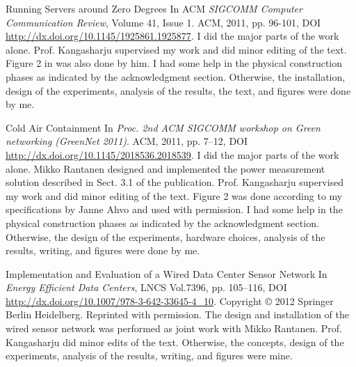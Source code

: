 \clearpage

\label{theme:free}

{Running Servers around Zero Degrees}
{In ACM \textit{SIGCOMM Computer Communication Review}, Volume 41, Issue 1. ACM, 2011, pp.
96-101, DOI \url{http://dx.doi.org/10.1145/1925861.1925877}.}
{}
{I did the major parts of the work alone. Prof. Kangasharju supervised my
work and did minor editing of the text. Figure 2 in was also done by him. I
had some help in the physical construction phases as indicated by the
acknowledgment section. Otherwise, the installation, design of the
experiments, analysis of the results, the text, and figures were done by
me.}
\label{pub:zero}


\label{theme:air}

{Cold Air Containment}
{In \textit{Proc. 2nd ACM SIGCOMM workshop on Green networking (GreenNet
2011)}. ACM, 2011, pp. 7--12, DOI \url{http://dx.doi.org/10.1145/2018536.2018539}.}
{}
{I did the major parts of the work alone. Mikko Rantanen designed and
implemented the power measurement solution described in Sect. 3.1 of the
publication. Prof. Kangasharju supervised my work and did minor editing of the
text. Figure 2 was done according to my specifications by Janne Ahvo and used
with permission. I had some help in the physical construction phases as
indicated by the acknowledgment section.  Otherwise, the design of the
experiments, hardware choices, analysis of the results, writing, and figures
were done by me.}
\label{pub:cac}


{Implementation and Evaluation of a Wired Data Center Sensor Network}
{In \textit{Energy Efficient Data Centers}, LNCS Vol.7396, pp. 105--116, DOI
\url{http://dx.doi.org/10.1007/978-3-642-33645-4_10}.}
{Copyright \copyright\hspace{2pt} 2012 Springer Berlin Heidelberg. Reprinted
with permission.}
{The design and installation of the wired sensor network was performed as
joint work with Mikko Rantanen. Prof. Kangasharju did minor edits of the text.
Otherwise, the concepts, design of the experiments, analysis of the results,
writing, and figures were mine.}
\label{pub:sensors}



